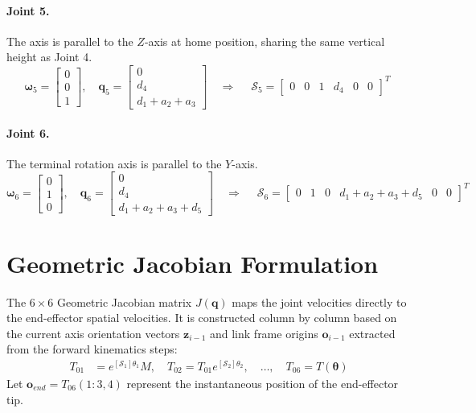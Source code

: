 \documentclass[11pt]{article}
\begin{document}
\paragraph{Joint 5.}
The axis is parallel to the $Z$-axis at home position, sharing the same vertical height as Joint 4.
\begin{equation}
  \mathbf{\omega}_5 = \begin{bmatrix} 0 \\ 0 \\ 1 \end{bmatrix}, \quad \mathbf{q}_5 = \begin{bmatrix} 0 \\ d_4 \\ d_1+a_2+a_3 \end{bmatrix} \quad \Rightarrow \quad \boxed{\;\mathcal{S}_5 = \begin{bmatrix} 0 & 0 & 1 & d_4 & 0 & 0 \end{bmatrix}^T\;}
\end{equation}

\paragraph{Joint 6.}
The terminal rotation axis is parallel to the $Y$-axis.
\begin{equation}
  \mathbf{\omega}_6 = \begin{bmatrix} 0 \\ 1 \\ 0 \end{bmatrix}, \quad \mathbf{q}_6 = \begin{bmatrix} 0 \\ d_4 \\ d_1+a_2+a_3+d_5 \end{bmatrix} \quad \Rightarrow \quad \boxed{\;\mathcal{S}_6 = \begin{bmatrix} 0 & 1 & 0 & d_1+a_2+a_3+d_5 & 0 & 0 \end{bmatrix}^T\;}
\end{equation}

\section{Geometric Jacobian Formulation}

The $6 \times 6$ Geometric Jacobian matrix $J(\mathbf{q})$ maps the joint velocities directly to the end-effector spatial velocities. It is constructed column by column based on the current axis orientation vectors $\mathbf{z}_{i-1}$ and link frame origins $\mathbf{o}_{i-1}$ extracted from the forward kinematics steps:
\begin{align}
  T_{01} &= e^{[\mathcal{S}_1]\theta_1} M, \quad T_{02} = T_{01}e^{[\mathcal{S}_2]\theta_2}, \quad \dots, \quad T_{06} = T(\mathbf{\theta})
\end{align}
Let $\mathbf{o}_{end} = T_{06}(1:3, 4)$ represent the instantaneous position of the end-effector tip.
\end{document}
